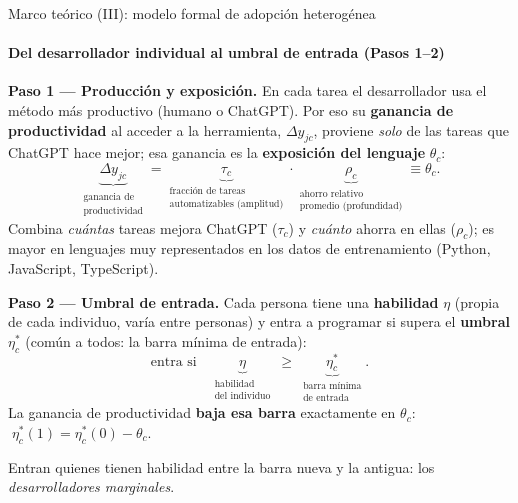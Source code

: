 \documentclass[10pt,aspectratio=169]{beamer}
\begin{document}
\begin{frame}{Marco teórico (III): modelo formal de adopción heterogénea}
\framesubtitle{Del desarrollador individual al umbral de entrada (Pasos 1--2)}
\small
\textbf{Paso 1 --- Producción y exposición.} En cada tarea el desarrollador usa el método más productivo (humano o ChatGPT). Por eso su \textbf{ganancia de productividad} al acceder a la herramienta, $\Delta y_{jc}$, proviene \emph{solo} de las tareas que ChatGPT hace mejor; esa ganancia es la \textbf{exposición del lenguaje} $\theta_c$:
\[
\underbrace{\Delta y_{jc}}_{\substack{\text{ganancia de}\\\text{productividad}}}=\underbrace{\tau_c}_{\substack{\text{fracción de tareas}\\\text{automatizables (amplitud)}}}\cdot\underbrace{\rho_c}_{\substack{\text{ahorro relativo}\\\text{promedio (profundidad)}}}\equiv\theta_c.
\]
{\footnotesize Combina \emph{cuántas} tareas mejora ChatGPT ($\tau_c$) y \emph{cuánto} ahorra en ellas ($\rho_c$); es mayor en lenguajes muy representados en los datos de entrenamiento (Python, JavaScript, TypeScript).}

\medskip
\textbf{Paso 2 --- Umbral de entrada.} Cada persona tiene una \textbf{habilidad} $\eta$ (propia de cada individuo, varía entre personas) y entra a programar si supera el \textbf{umbral} $\eta^*_c$ (común a todos: la barra mínima de entrada):
\[
\text{entra si}\quad \underbrace{\eta}_{\substack{\text{habilidad}\\\text{del individuo}}}\ \ge\ \underbrace{\eta^*_c}_{\substack{\text{barra mínima}\\\text{de entrada}}}.
\]
La ganancia de productividad \textbf{baja esa barra} exactamente en $\theta_c$: $\;\eta^*_c(1)=\eta^*_c(0)-\theta_c$.

{\footnotesize Entran quienes tienen habilidad entre la barra nueva y la antigua: los \textit{desarrolladores marginales}.}
\end{frame}
\end{document}
